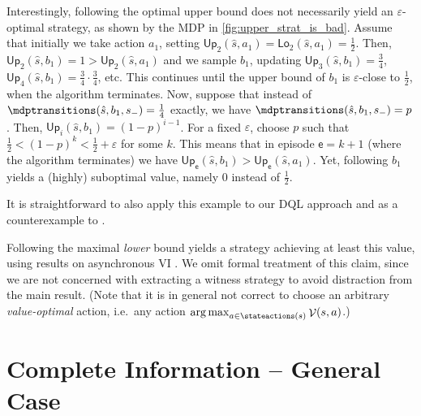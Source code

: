 \documentclass{article}
\DeclareMathOperator*{\argmax}{arg\,max}
\newcommand{\initialstate}{\hat{s}}
\DeclareMathOperator{\val}{\mathcal{V}}
\newcommand{\upperbound}{\mathsf{Up}}
\newcommand{\lowerbound}{\mathsf{Lo}}
\newcommand{\sinkstate}{s_-}
\newcommand{\algoepisode}{\mathsf{e}}
\begin{document}
\begin{example} \label{exa:upper_strat_is_bad}
	Interestingly, following the optimal upper bound does not necessarily yield an $\varepsilon$-optimal strategy, as shown by the MDP in \cref{fig:upper_strat_is_bad}.
	Assume that initially we take action $a_1$, setting $\upperbound_2(\initialstate, a_1) = \lowerbound_2(\initialstate, a_1) = \frac{1}{2}$.
	Then, $\upperbound_2(\initialstate, b_1) = 1 > \upperbound_2(\initialstate, a_1)$ and we sample $b_1$, updating $\upperbound_3(\initialstate, b_1) = \frac{3}{4}$,  $\upperbound_4(\initialstate, b_1) = \frac{3}{4} \cdot \frac{3}{4}$, etc.
	This continues until the upper bound of $b_1$ is $\varepsilon$-close to $\frac{1}{2}$, when the algorithm terminates.
	Now, suppose that instead of $\mdptransitions(\initialstate, b_1, \sinkstate) = \frac{1}{4}$ exactly, we have $\mdptransitions(\initialstate, b_1, \sinkstate) = p$.
	Then, $\upperbound_i(\initialstate, b_1) = (1 - p)^{i - 1}$.
	For a fixed $\varepsilon$, choose $p$ such that $\frac{1}{2} < (1-p)^k < \frac{1}{2} + \varepsilon$ for some $k$.
	This means that in episode $\algoepisode = k + 1$ (where the algorithm terminates) we have $\upperbound_{\algoepisode}(\initialstate, b_1) > \upperbound_{\algoepisode}(\initialstate, a_1)$.
	Yet, following $b_1$ yields a (highly) suboptimal value, namely $0$ instead of $\frac{1}{2}$.

	It is straightforward to also apply this example to our DQL approach and as a counterexample to \cite[Lemma~16]{DBLP:conf/atva/BrazdilCCFKKPU14}.  
\end{example}
Following the maximal \emph{lower} bound yields a strategy achieving at least this value, using results on asynchronous VI \cite{DBLP:books/wi/Puterman94}.
We omit formal treatment of this claim, since we are not concerned with extracting a witness strategy to avoid distraction from the main result.
(Note that it is in general not correct to choose an arbitrary \emph{value-optimal} action, i.e.\ any action $\argmax_{a \in \stateactions(s)} \val(s, a)$.)
 	\section{Complete Information -- General Case} \label{sec:brtdp}
\end{document}
